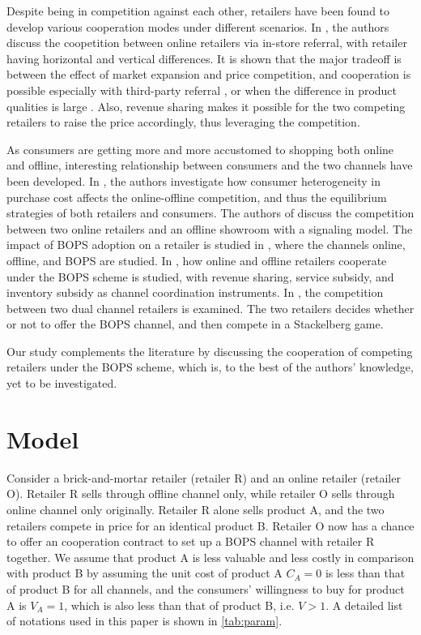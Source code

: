 \documentclass[a4paper]{article}
\theoremstyle{definition}
\theoremstyle{plain}
\theoremstyle{remark}
\begin{document}
Despite being in competition against each other,
retailers have been found to develop various cooperation modes under different scenarios.
In \cite{refer,refer_vert},
the authors discuss the coopetition between online retailers via in-store referral,
with retailer having horizontal \cite{refer} and vertical \cite{refer_vert} differences.
It is shown that the major tradeoff is between the effect of market expansion and price competition,
and cooperation is possible especially with third-party referral \cite{refer},
or when the difference in product qualities is large \cite{refer_vert}.
Also,
revenue sharing makes it possible for the two competing retailers to raise the price accordingly,
thus leveraging the competition.

As consumers are getting  more and more accustomed to shopping both online and offline,
interesting relationship between consumers and the two channels have been developed.
In \cite{consumer},
the authors investigate how consumer heterogeneity in purchase cost affects the online-offline competition,
and thus the equilibrium strategies of both retailers and consumers.
The authors of \cite{showroom} discuss the competition between two online retailers and an offline showroom with a signaling model.
The impact of BOPS adoption on a retailer is studied in \cite{BOPS_single},
where the channels online, offline, and BOPS are studied.
In \cite{BOPS_coop},
how online and offline retailers cooperate under the BOPS scheme is studied,
with revenue sharing, service subsidy, and inventory subsidy as channel coordination instruments.
In \cite{BOPS_dual},
the competition between two dual channel retailers is examined.
The two retailers decides whether or not to offer the BOPS channel,
and then compete in a Stackelberg game.

Our study complements the literature by discussing the cooperation of competing retailers under the BOPS scheme,
which is,
to the best of the authors' knowledge,
yet to be investigated.

\section{Model}\label{sec:model}
Consider a brick-and-mortar retailer (retailer R) and an online retailer (retailer O).
Retailer R sells through offline channel only,
while retailer O sells through online channel only originally.
Retailer R alone sells product A,
and the two retailers compete in price for an identical product B.
Retailer O now has a chance to offer an cooperation contract to set up a BOPS channel with retailer R together.
We assume that product A is less valuable and less costly in comparison with product B by assuming the unit cost of product A $C_A=0$ is less than that of product B for all channels,
and the consumers' willingness to buy for product A is $V_A=1$,
which is also less than that of product B,
i.e. $V>1$.
A detailed list of notations used in this paper is shown in \cref{tab:param}.
\end{document}
